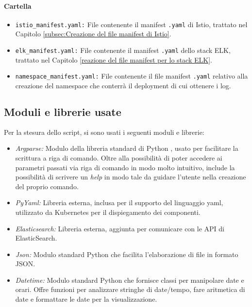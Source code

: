 \paragraph{Cartella }
\begin{itemize}
    \item \texttt{istio\_manifest.yaml:} File contenente il manifest \texttt{.yaml} di Istio, trattato nel Capitolo \ref{subsec:Creazione del file manifest di Istio}.
    \item \texttt{elk\_manifest.yaml:} File contenente il manifest \texttt{.yaml} dello stack ELK, trattato nel Capitolo \ref{reazione del file manifest per lo stack ELK}.
    \item \texttt{namespace\_manifest.yaml:} File contenente il file manifest \texttt{.yaml} relativo alla creazione del namespace che conterrà il deployment di cui ottenere i log.
\end{itemize}

\subsection{Moduli e librerie usate}
Per la stesura dello script, si sono usati i seguenti moduli e librerie:
\begin{itemize}
    \item \textit{Argparse:} Modulo della libreria standard di Python \cite{python_standard_library}, usato per facilitare la scrittura a riga di comando. Oltre alla possibilità di poter accedere ai parametri passati via riga di comando in modo molto intuitivo, include la possibilità di scrivere un \textit{help} in modo tale da guidare l'utente nella creazione del proprio comando.
    
    \item \textit{PyYaml:} Libreria esterna, inclusa per il supporto del linguaggio yaml, utilizzato da Kubernetes per il dispiegamento dei componenti.
    
    \item \textit{Elasticsearch:} Libreria esterna, aggiunta per comunicare con le API di ElasticSearch.
    
    \item \textit{Json:} Modulo standard Python che facilita l'elaborazione di file in formato JSON.
    
    \item \textit{Datetime:} Modulo standard Python che fornisce classi per manipolare date e orari. Offre funzioni per analizzare stringhe di date/tempo, fare aritmetica di date e formattare le date per la visualizzazione.
\end{itemize}

